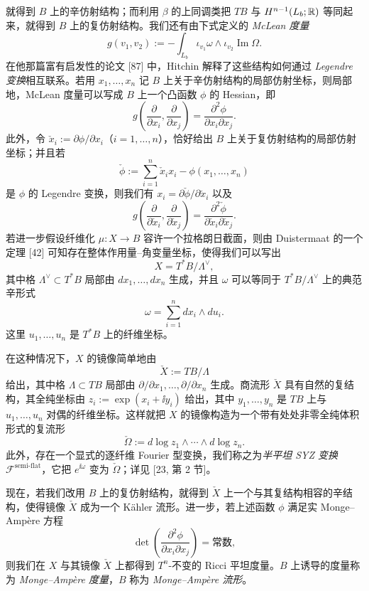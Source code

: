 就得到 $B$ 上的辛仿射结构；而利用 $\beta$ 的上同调类把 $TB$ 与 $H^{n-1}(L_b;\mathbb{R})$ 等同起来，就得到 $B$ 上的复仿射结构。我们还有由下式定义的 \emph{McLean 度量}
\[
  g(v_1,v_2) := -\int_{L_b} \iota_{v_1}\omega \wedge \iota_{v_2}\operatorname{Im}\Omega .
\]
在他那篇富有启发性的论文 [87] 中，Hitchin 解释了这些结构如何通过 \emph{Legendre 变换}相互联系。若用 $x_1,\dots,x_n$ 记 $B$ 上关于辛仿射结构的局部仿射坐标，则局部地，McLean 度量可以写成 $B$ 上一个凸函数 $\phi$ 的 Hessian，即
\[
  g\!\left(\frac{\partial}{\partial x_i},\frac{\partial}{\partial x_j}\right)
  = \frac{\partial^2\phi}{\partial x_i\partial x_j} .
\]
此外，令 $\check x_i := \partial\phi/\partial x_i$（$i=1,\dots,n$），恰好给出 $B$ 上关于复仿射结构的局部仿射坐标；并且若
\[
  \check\phi := \sum_{i=1}^{n} \check x_i x_i - \phi(x_1,\dots,x_n)
\]
是 $\phi$ 的 Legendre 变换，则我们有 $x_i = \partial\check\phi/\partial\check x_i$ 以及
\[
  g\!\left(\frac{\partial}{\partial\check x_i},\frac{\partial}{\partial\check x_j}\right)
  = \frac{\partial^2\check\phi}{\partial\check x_i\partial\check x_j} .
\]
若进一步假设纤维化 $\mu : X \to B$ 容许一个拉格朗日截面，则由 Duistermaat 的一个定理 [42] 可知存在整体作用量--角变量坐标，使得我们可以写出
\[
  X = T^*B/\Lambda^\vee ,
\]
其中格 $\Lambda^\vee \subset T^*B$ 局部由 $dx_1,\dots,dx_n$ 生成，并且 $\omega$ 可以等同于 $T^*B/\Lambda^\vee$ 上的典范辛形式
\[
  \omega = \sum_{i=1}^{n} dx_i \wedge du_i .
\]
这里 $u_1,\dots,u_n$ 是 $T^*B$ 上的纤维坐标。

在这种情况下，$X$ 的镜像简单地由
\[
  \check X := TB/\Lambda
\]
给出，其中格 $\Lambda \subset TB$ 局部由 $\partial/\partial x_1,\dots,\partial/\partial x_n$ 生成。商流形 $\check X$ 具有自然的复结构，其全纯坐标由 $z_i := \exp(x_i + \ii y_i)$ 给出，其中 $y_1,\dots,y_n$ 是 $TB$ 上与 $u_1,\dots,u_n$ 对偶的纤维坐标。这样就把 $X$ 的镜像构造为一个带有处处非零全纯体积形式的复流形
\[
  \check\Omega := d\log z_1 \wedge \cdots \wedge d\log z_n .
\]
此外，存在一个显式的逐纤维 Fourier 型变换，我们称之为\emph{半平坦 SYZ 变换} $\mathcal{F}^{\text{semi-flat}}$，它把 $e^{\ii\omega}$ 变为 $\check\Omega$；详见 [23, 第 2 节]。

现在，若我们改用 $B$ 上的复仿射结构，就得到 $\check X$ 上一个与其复结构相容的辛结构，使得镜像 $\check X$ 成为一个 K\"ahler 流形。进一步，若上述函数 $\phi$ 满足实 Monge--Amp\`ere 方程
\[
  \det\left(\frac{\partial^2\phi}{\partial x_i\partial x_j}\right) = \text{常数},
\]
则我们在 $X$ 与其镜像 $\check X$ 上都得到 $T^n$-不变的 Ricci 平坦度量。$B$ 上诱导的度量称为 \emph{Monge--Amp\`ere 度量}，$B$ 称为 \emph{Monge--Amp\`ere 流形}。

